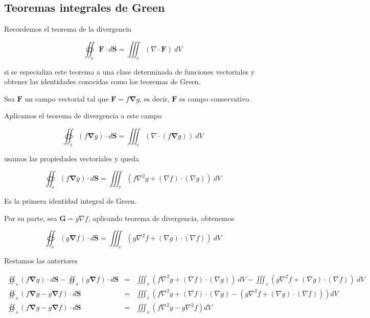 \subsection{Teoremas integrales de Green}

Recordemos el teorema de la divergencia

\begin{equation*}
\oiint_s \mathbf{F} \cdot d \mathbf{S} = \iiint_v (\nabla \cdot \mathbf{F}) \ d V
\end{equation*}

si se especializa este teorema a una clase determinada de funciones vectoriales y obtener las identidades conocidas como los teoremas de Green.

Sea $\mathbf{F}$ un campo vectorial tal que $\mathbf{F}= f \mathbf{\nabla}g$, es decir, $\mathbf{F}$ es campo conservativo.

Aplicamos el teorema de divergencia a este campo

\begin{equation*}
\oiint_s (f \mathbf{\nabla}g) \cdot d \mathbf{S} = \iiint_v (\nabla \cdot (f \mathbf{\nabla}g)) \ d V
\end{equation*}

usamos las propiedades vectoriales y queda

\begin{equation*}
\oiint_s (f \mathbf{\nabla}g) \cdot d \mathbf{S} =  \iiint_v \left( f \nabla^2 g + (\nabla f) \cdot (\nabla g) \right) \ d V
\end{equation*}

Es la primera identidad integral de Green.

Por su parte, sea $\mathbf{G}= g \nabla f$, aplicando teorema de divergencia, obtenemos

\begin{equation*}
\oiint_s (g \mathbf{\nabla}f) \cdot d \mathbf{S} =  \iiint_v \left( g \nabla^2 f + (\nabla g) \cdot (\nabla f) \right) \ d V
\end{equation*}

Restamos las anteriores

\begin{eqnarray*}
\oiint_s (f \mathbf{\nabla}g) \cdot d \mathbf{S} - \oiint_s (g \mathbf{\nabla}f) \cdot d \mathbf{S} &=& \iiint_v \left( f \nabla^2 g + (\nabla f) \cdot (\nabla g) \right) \ d V - \iiint_v \left( g \nabla^2 f + (\nabla g) \cdot (\nabla f) \right) \ d V \\
\oiint_s (f \mathbf{\nabla}g - g \mathbf{\nabla}f ) \cdot d \mathbf{S} &=& \iiint_v \left( f \nabla^2 g + (\nabla f) \cdot (\nabla g) - \left( g \nabla^2 f + (\nabla g) \cdot (\nabla f) \right) \right) dV \\
\oiint_s (f \mathbf{\nabla}g - g \mathbf{\nabla}f ) \cdot d \mathbf{S} &=& \iiint_v \left( f \nabla^2 g - g \nabla^2 f \right) dV \\
\end{eqnarray*}

